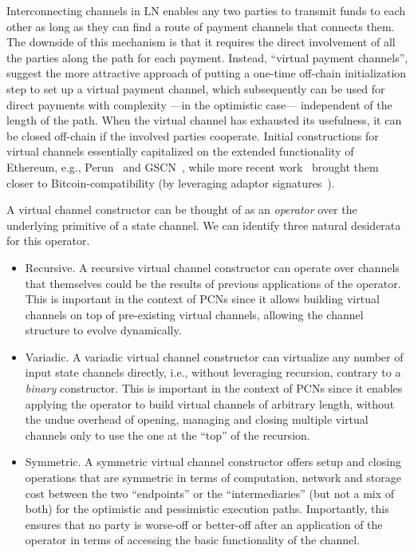 Interconnecting channels in LN enables any two parties to transmit funds
to each other as long as they can find a route of payment channels that connects
them. The downside of this mechanism is that it requires the direct involvement
of all the parties along the path for each payment. Instead, ``virtual payment
channels'', suggest the more attractive approach of putting a one-time off-chain
initialization step to set up a virtual payment channel, which subsequently can
be used for direct payments with complexity ---in the optimistic case---
independent of the length of the path. When the virtual channel has exhausted
its usefulness, it can be closed off-chain if the involved parties cooperate.
Initial constructions for virtual channels essentially capitalized on the extended functionality of Ethereum, e.g.,
Perun~\cite{perun} and GSCN~\cite{DBLP:conf/ccs/DziembowskiFH18}, while more
recent work~\cite{9519487} brought them closer to
Bitcoin-compatibility (by leveraging adaptor
signatures~\cite{DBLP:journals/iacr/AumayrEEFHMMR20}).

A virtual channel constructor can be thought of as an \emph{operator} over the
underlying primitive of a state channel. We can identify three natural
desiderata for this operator.

\begin{itemize}
\item Recursive. A recursive virtual channel constructor can operate over
channels that themselves could be the results of previous applications of the
operator. This is important in the context of PCNs since it allows building
virtual channels on top of pre-existing virtual channels, allowing the channel
structure to evolve dynamically.
\item Variadic. A variadic virtual channel constructor can virtualize any number
of input state channels directly, i.e., without leveraging recursion, contrary to a \emph{binary} constructor. This is
important in the context of PCNs since it enables applying the operator to build
virtual channels of arbitrary length, without the undue overhead of opening,
managing and closing multiple virtual channels only to use the one at the
``top'' of the recursion.
\item Symmetric. A symmetric virtual channel constructor offers setup and
closing operations that are symmetric in terms of computation, network and storage cost between the two
``endpoints'' or the ``intermediaries'' (but not a mix of both) for the
optimistic and pessimistic execution paths. Importantly, this ensures that no party is worse-off or better-off after an application of the operator in terms of accessing the basic functionality of the channel.
\end{itemize}

